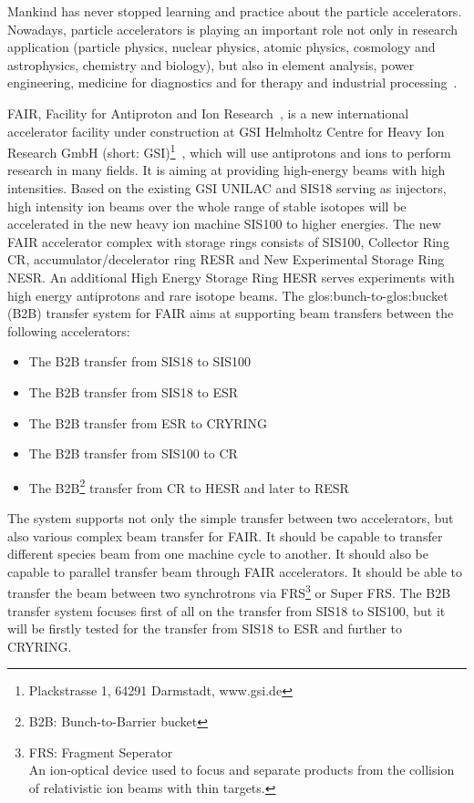 Mankind has never stopped learning and practice about the particle accelerators. Nowadays, particle accelerators is playing an important role not only in research application (particle physics, nuclear physics, atomic physics, cosmology and astrophysics, chemistry and biology), but also in element analysis, power engineering, medicine for diagnostics and for therapy and industrial processing~\cite{barbalat_applications_1994}. 


FAIR, Facility for Antiproton and Ion Research~\cite{_fair_2011}, is a new international accelerator facility under construction at GSI Helmholtz Centre for Heavy Ion Research GmbH (short: GSI)\footnote{Plackstrasse 1, 64291 Darmstadt, www.gsi.de}~\cite{_gsi_2011}, which will use antiprotons and ions to perform research in many fields. It is aiming at providing high-energy beams with high intensities. Based on the existing GSI UNILAC and SIS18 serving as injectors, high intensity ion beams over the whole range of stable isotopes will be accelerated in the new heavy ion machine SIS100 to higher energies. The new FAIR accelerator complex with storage rings consists of SIS100, Collector Ring CR, accumulator/decelerator ring RESR and New Experimental Storage Ring NESR. An additional High Energy Storage Ring HESR serves experiments with high energy antiprotons and rare isotope beams. The \gls{glos:bunch}-to-\gls{glos:bucket} (\gls{B2B}) transfer system for FAIR aims at supporting beam transfers between the following accelerators:
\begin{itemize}
\item The B2B transfer from SIS18 to SIS100
\item The B2B transfer from SIS18 to ESR
\item The B2B transfer from ESR to CRYRING
\item The B2B transfer from SIS100 to CR
\item The B2B\footnote{B2B: Bunch-to-Barrier bucket} transfer from CR to HESR and later to RESR
\end{itemize}

The system supports not only the simple transfer between two accelerators, but also various complex beam transfer for FAIR. It should be capable to transfer different species beam from one machine cycle to another. It should also be capable to parallel transfer beam through FAIR accelerators. It should be able to transfer the beam between two synchrotrons via FRS\footnote{FRS: Fragment Seperator \\An ion-optical device used to focus and separate products from the collision of relativistic ion beams with thin targets.} or Super FRS. The B2B transfer system focuses first of all on the transfer from SIS18 to SIS100, but it will be firstly tested for the transfer from SIS18 to ESR and further to CRYRING.  

